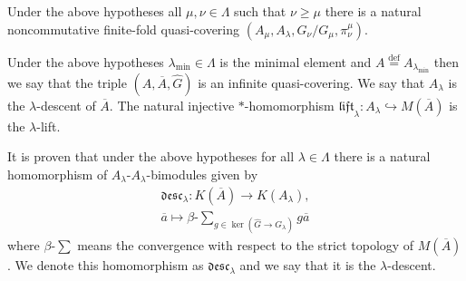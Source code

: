 \documentclass{beamer}
\theoremstyle{plain}
\newcommand{\be}{\begin{equation}}
\newcommand{\ee}{\end{equation}}
\newcommand{\desc}{\mathfrak{desc}}
\newcommand{\lift}{\mathfrak{lift}}
\newcommand{\la}{\lambda}
\newcommand{\La}{\Lambda}
\newcommand{\bt}{\beta}           %
\newcommand{\bydef}{\stackrel{\mathrm{def}}{=}}
\newcommand{\hookto}{\hookrightarrow}        %
\begin{document}
\begin{frame}
 \begin{lemma}\label{infinite_quasi_covering_lem}
	Under the above hypotheses  all $\mu, \nu \in \La$ such that $\nu\ge\mu$ there is a natural noncommutative finite-fold quasi-covering $\left(A_\mu, A_\la, G_\nu/ G_\mu, \pi^\mu_\nu\right)$.
\end{lemma}
\end{frame}
\begin{frame}
 \begin{definition}\label{infinite_quasicovering_defn} 	Under the above hypotheses    $\la_{\mathrm{min}}\in \La$ is the minimal element and $A\bydef A_{\la_{\min}}$ then we say that the triple $\left( A, \overline A, \widehat G\right)$ is an  \alert{infinite quasi-covering}. We say that $A_\la$ is the $\la$-\alert{descent of} $\overline A$. The natural injective $*$-homomorphism $\lift_\la: A_\la \hookto M\left(\overline A \right)$ is the $\la$-\alert{lift}.
\end{definition}
\begin{definition}\label{infinite_desc_defn}
It is proven that under the above  hypotheses   for all $\la\in\La$ there is a  natural   homomorphism of $A_\la$-$A_\la$-bimodules given by
	\be\label{inf_desc_eqn}
	\begin{split}
		\desc_{\la} : K\left(\overline A \right) \to K\left(A_\la \right),\\
		\overline a \mapsto\bt\text{-} \sum_{	g \in \ker\left( \widehat{G}\to G_\la\right) }g \overline a
	\end{split}
	\ee
	where  $\bt\text{-} \sum$ means the convergence with respect to the strict topology of $M\left(\overline A\right)$. 
	We denote this homomorphism as   $\desc_{\la}$ and we say that it is  the $\la$-\alert{descent}.%
\end{definition}

\end{frame}
\end{document}

